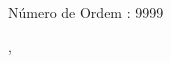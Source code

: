   \begin{capa}%
    \center
	\ABNTEXchapterfont\large{\imprimirinstituicao \\ \imprimircentro \\ \imprimirtrabalho}

    \vfill
    \ABNTEXchapterfont\bfseries\LARGE\imprimirtitulo
    \vfill

	\ABNTEXchapterfont\large\imprimirautor
	\vfill
%
	Número de Ordem : 9999
	
    \large\imprimirlocal, \large\imprimirdata

    \vspace*{1cm}
  \end{capa}
